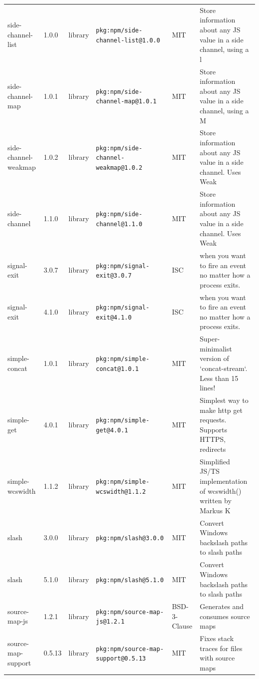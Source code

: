 \documentclass[11pt,a4paper]{article}
\begin{document}
\begin{longtable}{|p{4cm}|p{2cm}|p{1.6cm}|p{5cm}|p{1.5cm}|p{3.5cm}|}
\raggedright side-channel-list & 1.0.0 & library & \small\texttt{pkg:npm/side-channel-list@1.0.0} & MIT & \small Store information about any JS value in a side channel, using a l \\
\raggedright side-channel-map & 1.0.1 & library & \small\texttt{pkg:npm/side-channel-map@1.0.1} & MIT & \small Store information about any JS value in a side channel, using a M \\
\raggedright side-channel-weakmap & 1.0.2 & library & \small\texttt{pkg:npm/side-channel-weakmap@1.0.2} & MIT & \small Store information about any JS value in a side channel. Uses Weak \\
\raggedright side-channel & 1.1.0 & library & \small\texttt{pkg:npm/side-channel@1.1.0} & MIT & \small Store information about any JS value in a side channel. Uses Weak \\
\raggedright signal-exit & 3.0.7 & library & \small\texttt{pkg:npm/signal-exit@3.0.7} & ISC & \small when you want to fire an event no matter how a process exits. \\
\raggedright signal-exit & 4.1.0 & library & \small\texttt{pkg:npm/signal-exit@4.1.0} & ISC & \small when you want to fire an event no matter how a process exits. \\
\raggedright simple-concat & 1.0.1 & library & \small\texttt{pkg:npm/simple-concat@1.0.1} & MIT & \small Super-minimalist version of `concat-stream`. Less than 15 lines! \\
\raggedright simple-get & 4.0.1 & library & \small\texttt{pkg:npm/simple-get@4.0.1} & MIT & \small Simplest way to make http get requests. Supports HTTPS, redirects \\
\raggedright simple-wcswidth & 1.1.2 & library & \small\texttt{pkg:npm/simple-wcswidth@1.1.2} & MIT & \small Simplified JS/TS implementation of wcswidth() written by Markus K \\
\raggedright slash & 3.0.0 & library & \small\texttt{pkg:npm/slash@3.0.0} & MIT & \small Convert Windows backslash paths to slash paths \\
\raggedright slash & 5.1.0 & library & \small\texttt{pkg:npm/slash@5.1.0} & MIT & \small Convert Windows backslash paths to slash paths \\
\raggedright source-map-js & 1.2.1 & library & \small\texttt{pkg:npm/source-map-js@1.2.1} & BSD-3-Clause & \small Generates and consumes source maps \\
\raggedright source-map-support & 0.5.13 & library & \small\texttt{pkg:npm/source-map-support@0.5.13} & MIT & \small Fixes stack traces for files with source maps \\

\end{longtable}
\end{document}
